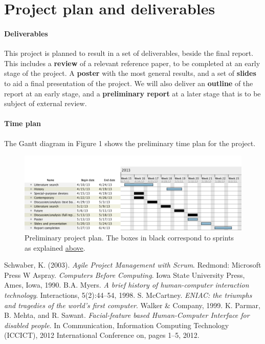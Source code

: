 \documentclass[a4paper,10pt]{article}
\begin{document}
\section{Project plan and deliverables}
\paragraph{Deliverables}
This project is planned to result in a set of deliverables, beside the final report. This includes a \textbf{review} of a relevant reference paper, to be completed at an early stage of the project. A \textbf{poster} with the most general results, and a set of \textbf{slides} to aid a final presentation of the project. We will also deliver an \textbf{outline} of the report at an early stage, and a \textbf{preliminary report} at a later stage that is to be subject of external review.


\paragraph{Time plan}

The Gantt diagram in Figure 1 shows the preliminary time plan for the project. 

\begin{figure}[h!]
\includegraphics[width=\textwidth]{ganttuppsats.png}
\caption{Preliminary project plan. The boxes in black correspond to sprints as explained \hyperref[sec:method]{above}.}
\label{fig:timePlan}
\end{figure}


\begin{thebibliography}{4}
 Schwaber, K. (2003). \emph{Agile Project Management with Scrum}. Redmond: Microsoft Press
 W Aspray. \emph{Computers Before Computing}. Iowa State University Press, Ames, Iowa, 1990.
B.A. Myers. \emph{A brief history of human-computer interaction technology}. Interactions, 5(2):44–54, 1998.
S. McCartney. \emph{ENIAC: the triumphs and tragedies of the world’s first computer}. Walker \& Company, 1999.
K. Parmar, B. Mehta, and R. Sawant. \emph{Facial-feature based Human-Computer Interface for disabled people}. In Communication, Information Computing Technology (ICCICT), 2012 International Conference on, pages 1–5, 2012.


\end{thebibliography}
\end{document}
